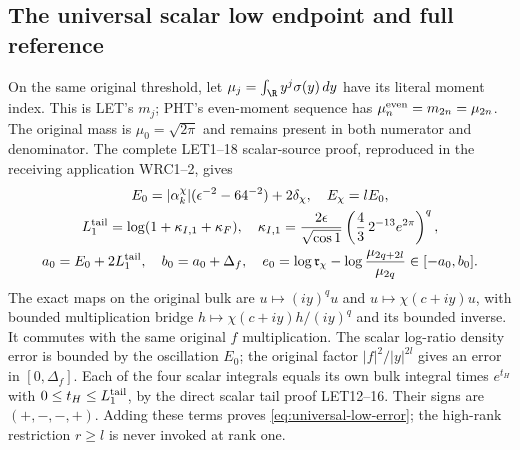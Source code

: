 \subsection{The universal scalar low endpoint and full reference}
On the same original threshold, let $\mu_j=\int_{\R}y^j\sigma(y)\,dy$
have its literal moment index. This is LET's $m_j$; PHT's
even-moment sequence has $\mu_n^{\rm even}=m_{2n}=\mu_{2n}$.
The original mass is $\mu_0=\sqrt{2\pi}$ and remains present
in both numerator and denominator. The complete LET1--18
scalar-source proof, reproduced in the receiving application
WRC1--2, gives
\begin{equation}
\begin{gathered}
 E_0=|\alpha_k^\chi|(\epsilon^{-2}-64^{-2})+2\delta_\chi,
 \quad E_\chi=lE_0,\\
 L_1^{\rm tail}=\log(1+\kappa_{I,1}+\kappa_F),\quad
 \kappa_{I,1}=\frac{2\epsilon}{\sqrt{\cos1}}
       \left(\frac43\,2^{-13}e^{2\pi}\right)^q,\\
 a_0=E_0+2L_1^{\rm tail},\quad b_0=a_0+\Delta_f,\quad
 e_0=\log\mathfrak r_\chi-
       \log\frac{\mu_{2q+2l}}{\mu_{2q}}\in[-a_0,b_0].
\end{gathered}\label{eq:universal-low-error}
\end{equation}
The exact maps on the original bulk are $u\mapsto(iy)^q u$
and $u\mapsto\chi(c+iy)u$, with bounded multiplication bridge
$h\mapsto\chi(c+iy)h/(iy)^q$ and its bounded inverse.
It commutes with the same original $f$ multiplication.
The scalar log-ratio density error is bounded by the oscillation
$E_0$; the original factor $|f|^2/|y|^{2l}$ gives an error
in $[0,\Delta_f]$. Each of the four scalar integrals equals
its own bulk integral times $e^{t_H}$ with
$0\leq t_H\leq L_1^{\rm tail}$, by the direct scalar tail
proof LET12--16. Their signs are $(+,-,-,+)$.
Adding these terms proves \eqref{eq:universal-low-error};
the high-rank restriction $r\geq l$ is never invoked at rank one.

